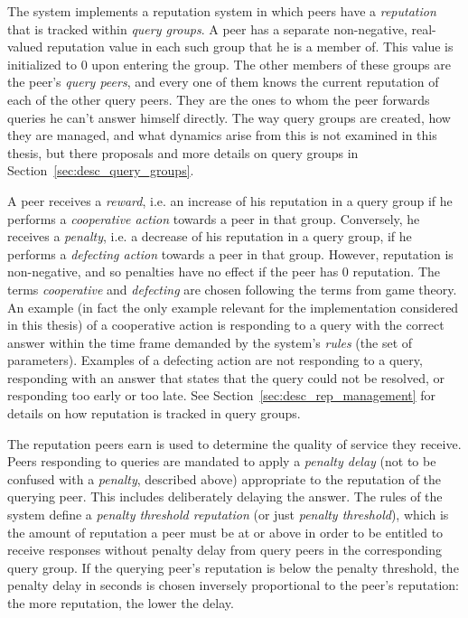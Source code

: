 The system implements a reputation system in which peers have a
\emph{reputation} that is tracked within \emph{query groups}. A peer has a
separate non-negative, real-valued reputation value in each such group that he
is a member of. This value is initialized to 0 upon entering the group. The
other members of these groups are the peer's \emph{query peers}, and every one
of them knows the current reputation of each of the other query peers. They are
the ones to whom the peer forwards queries he can't answer himself directly. The
way query groups are created, how they are managed, and what dynamics arise from
this is not examined in this thesis, but there proposals and more details on
query groups in Section~\ref{sec:desc_query_groups}.

A peer receives a \emph{reward}, i.e. an increase of his reputation in a query
group if he performs a \emph{cooperative action} towards a peer in that group.
Conversely, he receives a \emph{penalty}, i.e. a decrease of his reputation in a
query group, if he performs a \emph{defecting action} towards a peer in that
group. However, reputation is non-negative, and so penalties have no effect if
the peer has 0 reputation. The terms \emph{cooperative} and \emph{defecting} are
chosen following the terms from game theory. An example (in fact the only
example relevant for the implementation considered in this thesis) of a
cooperative action is responding to a query with the correct answer within the
time frame demanded by the system's \emph{rules} (the set of parameters).
Examples of a defecting action are not responding to a query, responding with an
answer that states that the query could not be resolved, or responding too early
or too late. See Section~\ref{sec:desc_rep_management} for details on how
reputation is tracked in query groups.

The reputation peers earn is used to determine the quality of service they
receive. Peers responding to queries are mandated to apply a \emph{penalty
delay} (not to be confused with a \emph{penalty}, described above) appropriate
to the reputation of the querying peer. This includes deliberately delaying the
answer. The rules of the system define a \emph{penalty threshold reputation} (or
just \emph{penalty threshold}), which is the amount of reputation a peer must be
at or above in order to be entitled to receive responses without penalty delay
from query peers in the corresponding query group. If the querying peer's
reputation is below the penalty threshold, the penalty delay in seconds is
chosen inversely proportional to the peer's reputation: the more reputation, the
lower the delay.

